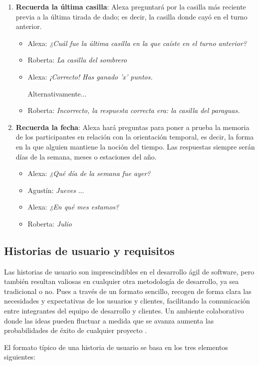\begin{enumerate}
	\item \textbf{Recuerda la última casilla}: Alexa preguntará por la casilla más reciente previa a la última tirada de dado; es decir, la casilla donde cayó en el turno anterior.
	\begin{itemize}
		\item Alexa: \textit{¿Cuál fue la última casilla en la que caíste en el turno anterior?}
		\item Roberta: \textit{La casilla del sombrero}
		\item Alexa: \textit{¡Correcto! Has ganado 'x' puntos.}
		
		Alternativamente...
		\item Roberta: \textit{Incorrecto, la respuesta correcta era: la casilla del paraguas.}
	\end{itemize}
	
	\item \textbf{Recuerda la fecha}: Alexa hará preguntas para poner a prueba la memoria de los participantes en relación con la orientación temporal, es decir, la forma en la que alguien mantiene la noción del tiempo. Las respuestas siempre serán días de la semana, meses o estaciones del año.
	\begin{itemize}
		\item Alexa: \textit{¿Qué día de la semana fue ayer?}
		\item Agustín: \textit{Jueves}
		...
		\item Alexa: \textit{¿En qué mes estamos?}
		\item Roberta: \textit{Julio}
	\end{itemize}
\end{enumerate}


\subsection{Historias de usuario y requisitos}

Las historias de usuario son imprescindibles en el desarrollo ágil de software, pero también resultan valiosas en cualquier otra metodología de desarrollo, ya sea tradicional o no. Pues a través de un formato sencillo, recogen de forma clara las necesidades y expectativas de los usuarios y clientes, facilitando la comunicación entre integrantes del equipo de desarrollo y clientes. Un ambiente colaborativo donde las ideas pueden fluctuar a medida que se avanza aumenta las probabilidades de éxito de cualquier proyecto \parencite{introHU}.

El formato típico de una historia de usuario se basa en los  tres elementos siguientes:

